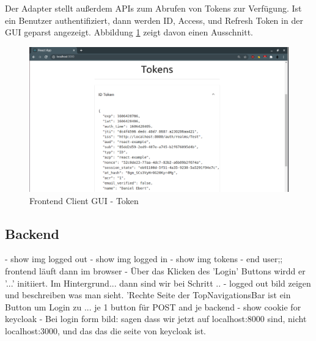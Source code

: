 Der Adapter stellt außerdem APIs zum Abrufen von Tokens zur Verfügung. Ist ein Benutzer authentifiziert, dann werden ID, Access, und Refresh Token in der GUI geparst angezeigt. Abbildung \ref{fig:EB_Token} zeigt davon einen Ausschnitt.

\begin{figure}[!ht]
	\centering
	\includegraphics[width=1\textwidth]{Images/Ebert/FrontendIDTokenExample.PNG}
	\caption{Frontend Client GUI - Token}
	\label{fig:EB_Token}
\end{figure} 



\subsection{Backend} \label{EB_Backend}





- show img logged out
- show img logged in
- show img tokens
- end user;; frontend läuft dann im browser
- Über das Klicken des 'Login' Buttons wirdd er '...' initiiert. Im Hintergrund... dann sind wir bei Schritt ..
- logged out bild zeigen und beschreiben was man sieht. 'Rechte Seite der TopNavigationsBar ist ein Button um Login zu ... je 1 button für POST and je backend
- show cookie for keycloak
- Bei login form bild: sagen dass wir jetzt auf localhost:8000 sind, nicht localhost:3000, und das das die seite von keycloak ist.


